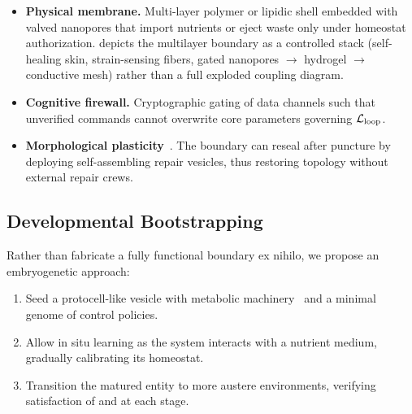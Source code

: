 \documentclass[11pt]{article}
\begin{document}

\begin{itemize}
\item \textbf{Physical membrane.} Multi-layer polymer or lipidic shell embedded with valved nanopores that import nutrients or eject waste only under homeostat authorization.  depicts the multilayer boundary as a controlled stack (self-healing skin, strain-sensing fibers, gated nanopores $\rightarrow$ hydrogel $\rightarrow$ conductive mesh) rather than a full exploded coupling diagram.
\item \textbf{Cognitive firewall.} Cryptographic gating of data channels such that unverified commands cannot overwrite core parameters governing $\mathcal{L}_{\text{loop}}$.
\item \textbf{Morphological plasticity}~\cite{bongard2011morphological,kriegman2020scalable}. The boundary can reseal after puncture by deploying self-assembling repair vesicles, thus restoring topology without external repair crews.
\end{itemize}

\subsection{Developmental Bootstrapping}
\label{sec:dev_bootstrap}

Rather than fabricate a fully functional boundary ex nihilo, we propose an embryogenetic approach:

\begin{enumerate}
\item Seed a protocell-like vesicle with metabolic machinery~\cite{ruizmirazo2008basic} and a minimal genome of control policies.
\item Allow in situ learning as the system interacts with a nutrient medium, gradually calibrating its homeostat.
\item Transition the matured entity to more austere environments, verifying satisfaction of \NC and \SC at each stage.
\end{enumerate}
\end{document}
